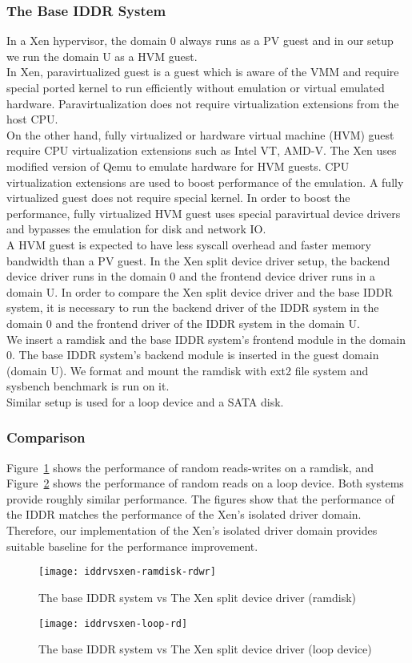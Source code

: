 \subsubsection*{The Base IDDR System}
In a Xen hypervisor, the domain 0 always runs as a PV guest and in our setup we run the domain U as a HVM guest.
\\[3mm] 
In Xen, paravirtualized guest is a guest which is aware of the VMM and require special ported kernel to run efficiently without emulation or virtual emulated hardware. Paravirtualization does not require virtualization extensions from the host CPU. 
\\[3mm]
On the other hand, fully virtualized or hardware virtual machine (HVM) guest require CPU virtualization extensions such as Intel VT, AMD-V. The Xen uses modified version of Qemu to emulate hardware for HVM guests. CPU virtualization extensions are used to boost performance of the emulation. A fully virtualized guest does not require special kernel. In order to boost the performance, fully virtualized HVM guest uses special paravirtual device drivers and bypasses the emulation for disk and network IO.
\\[3mm]
A HVM guest is expected to have less syscall overhead and faster memory bandwidth than a PV guest. In the Xen split device driver setup, the backend device driver runs in the domain 0 and the frontend device driver runs in a domain U. In order to compare the Xen split device driver and the base IDDR system, it is necessary to run the backend driver of the IDDR system in the domain 0 and the frontend driver of the IDDR system in the domain U.
\\[3mm]
We insert a ramdisk and the base IDDR system's frontend module in the domain 0. The base IDDR system's backend module is inserted in the guest domain (domain U). We format and mount the ramdisk with ext2 file system and sysbench benchmark is run on it.  
\\[3mm]
Similar setup is used for a loop device and a SATA disk.
\subsubsection*{Comparison}
Figure~\ref{fig:iddrvsxen-ramdisk-rdwr} shows the performance of random reads-writes on a ramdisk, and Figure~\ref{fig:iddrvsxen-loop-rd} shows the performance of random reads on a loop device. Both systems provide roughly similar performance. The figures show that the performance of the IDDR matches the performance of the Xen's isolated driver domain. Therefore, our implementation of the Xen's isolated driver domain provides suitable baseline for the performance improvement.
\begin{figure}[!ht]
\centering
\texttt{[image: iddrvsxen-ramdisk-rdwr]}
\caption{The base IDDR system vs The Xen split device driver (ramdisk)}
\label{fig:iddrvsxen-ramdisk-rdwr}
\end{figure}
\begin{figure}[!ht]
\centering
\texttt{[image: iddrvsxen-loop-rd]}
\caption{The base IDDR system vs The Xen split device driver (loop device)}
\label{fig:iddrvsxen-loop-rd}
\end{figure}

